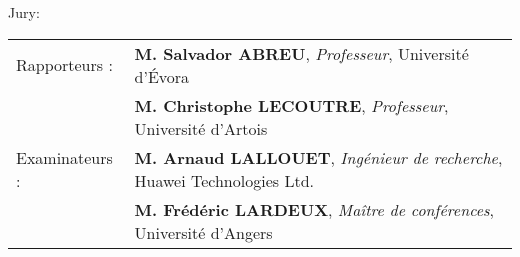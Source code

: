 \begin{titlepage}
\begin{center}
\end{center}
\end{titlepage}
\restoregeometry
\sloppy\pagebreak


\begin{vcentrepage}
{ \begin{center}\Large {\sc Jury}:  \end{center}}
\vspace{1em}

\begin{tabular}{ll}
Rapporteurs : & \textbf{M. Salvador ABREU}, \textit{Professeur}, Université d'Évora \\
& \textbf{M. Christophe LECOUTRE}, \textit{Professeur}, Université d'Artois \\
Examinateurs : & \textbf{M. Arnaud LALLOUET}, \textit{Ingénieur de recherche}, Huawei Technologies Ltd. \\
& \textbf{M. Frédéric LARDEUX}, \textit{Maître de conférences}, Université d'Angers \\
\end{tabular}

\pagestyle{plain}


\end{vcentrepage}
